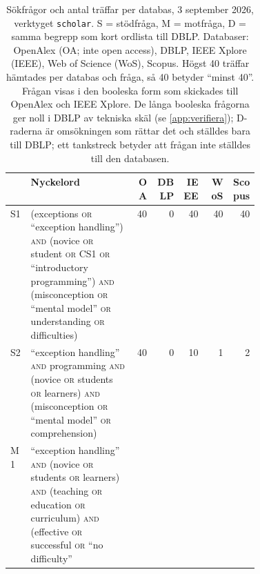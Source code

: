 \begin{table}[htbp]
  \centering
  \caption{Sökfrågor och antal träffar per databas, 3
    september 2026, verktyget \texttt{scholar}.  S = stödfråga,
    M = motfråga, D = samma begrepp som kort ordlista till DBLP.
    Databaser: OpenAlex (OA; inte \foreignlanguage{english}{open
    access}), DBLP, IEEE Xplore (IEEE), Web of Science (WoS), Scopus.
    Högst 40 träffar hämtades per databas och fråga, så 40 betyder
    \enquote{minst 40}.  Frågan visas i den booleska form som skickades
    till OpenAlex och IEEE Xplore.  De långa booleska frågorna ger noll
    i DBLP av tekniska skäl (se \cref{app:verifiera}); D-raderna är
    omsökningen som rättar det och ställdes bara till DBLP; ett
    tankstreck betyder att frågan inte ställdes till den
    databasen.}
  \label{tab:nyb-queries}
  \footnotesize
  \begin{tabular}{@{}lp{0.42\linewidth}rrrrr@{}}
    \toprule
    & Nyckelord & OA & DBLP & IEEE & WoS & Scopus \\
    \midrule
    S1 & (exceptions \textsc{or} \enquote{exception handling})
      \textsc{and} (novice \textsc{or} student \textsc{or} CS1
      \textsc{or} \enquote{introductory programming}) \textsc{and}
      (misconception \textsc{or} \enquote{mental model} \textsc{or}
      understanding \textsc{or} difficulties)
      & 40 & 0 & 40 & 40 & 40 \\
    S2 & \enquote{exception handling} \textsc{and} programming
      \textsc{and} (novice \textsc{or} students \textsc{or} learners)
      \textsc{and} (misconception \textsc{or} \enquote{mental model}
      \textsc{or} comprehension)
      & 40 & 0 & 10 & 1 & 2 \\
    M1 & \enquote{exception handling} \textsc{and} (novice \textsc{or}
      students \textsc{or} learners) \textsc{and} (teaching \textsc{or}
      education \textsc{or} curriculum) \textsc{and} (effective
      \textsc{or} successful \textsc{or} \enquote{no difficulty}

\end{tabular}
\end{table}
